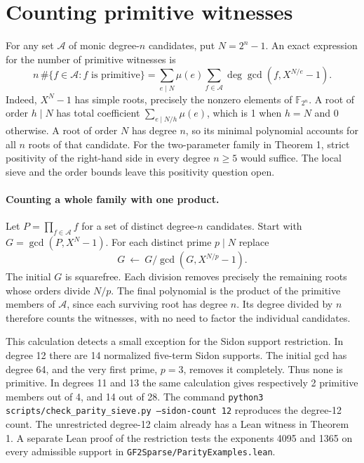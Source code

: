 \documentclass[11pt]{article}
\begin{document}
\section{Counting primitive witnesses}
For any set \(\mathcal A\) of monic degree-\(n\) candidates, put \(N=2^n-1\).
An exact expression for the number of primitive witnesses is
\[
 n\,\#\{f\in\mathcal A:f\text{ is primitive}\}
  =\sum_{e\mid N}\mu(e)\sum_{f\in\mathcal A}
      \deg\gcd(f,X^{N/e}-1).
\]
Indeed, \(X^N-1\) has simple roots, precisely the nonzero elements of
\(\mathbb F_{2^n}\). A root of order \(h\mid N\) has total coefficient
\(\sum_{e\mid N/h}\mu(e)\), which is 1 when \(h=N\) and 0 otherwise.
A root of order \(N\) has degree \(n\), so its minimal polynomial accounts
for all \(n\) roots of that candidate. For the two-parameter family in
Theorem 1, strict positivity of the right-hand side in every degree
\(n\ge5\) would suffice. The local sieve and the order bounds leave this
positivity question open.

\paragraph{Counting a whole family with one product.}
Let \(P=\prod_{f\in\mathcal A}f\) for a set of distinct degree-\(n\) candidates.
Start with \(G=\gcd(P,X^N-1)\). For each distinct prime \(p\mid N\) replace
\[
                   G\ \longleftarrow\ G/\gcd(G,X^{N/p}-1).
\]
The initial \(G\) is squarefree. Each division removes precisely the
remaining roots whose orders divide \(N/p\). The final polynomial is
the product of the primitive members of \(\mathcal A\), since each
surviving root has degree \(n\). Its degree divided by \(n\) therefore
counts the witnesses, with no need to factor the individual candidates.

This calculation detects a small exception for the Sidon support restriction.
In degree 12 there are 14 normalized five-term Sidon supports.
The initial gcd has degree 64, and the very first prime, \(p=3\), removes
it completely. Thus none is primitive. In degrees 11 and 13 the same
calculation gives respectively 2 primitive members out of 4, and 14 out of 28.
The command \texttt{python3 scripts/check\_parity\_sieve.py --sidon-count 12}
reproduces the degree-12 count. The unrestricted degree-12 claim already
has a Lean witness in Theorem 1. A separate Lean proof of the restriction
tests the exponents 4095 and 1365 on every admissible support in
\texttt{GF2Sparse/ParityExamples.lean}.
\end{document}
